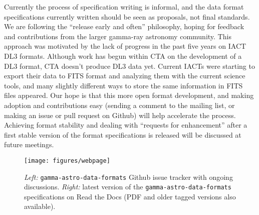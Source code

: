 Currently the process of specification writing is informal, and the data format specifications currently written should be seen as proposals, not final standards. We are following the ``release early and often'' philosophy, hoping for feedback and contributions from the larger gamma-ray astronomy community. This approach was motivated by the lack of progress in the past five years on IACT DL3 formats.  Although work has begun within CTA on the development of a DL3 format, CTA doesn't produce DL3 data yet.  Current IACTs were starting to export their data to FITS format and analyzing them with the current science tools, and many slightly different ways to store the same information in FITS files appeared.  Our hope is that this more open format development, and making adoption and contributions easy (sending a comment to the mailing list, or making an issue or pull request on Github) will help accelerate the process.  Achieving format stability and dealing with ``requests for enhancement'' after a first stable version of the format specifications is released will be discussed at future meetings.

\begin{figure}[tb]
\centerline{\texttt{[image: figures/webpage]}}
\caption{
\emph{Left:} \texttt{gamma-astro-data-formats} Github issue tracker with ongoing discussions. \emph{Right:} latest version of the \texttt{gamma-astro-data-formats} specifications on Read the Docs (PDF and older tagged versions also available).
}
\label{fig:webpage}
\end{figure}
